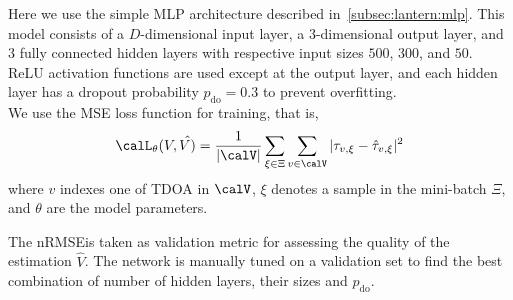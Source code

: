 \mynewline
Here we use the simple \ac{MLP} architecture described in~\cref{subsec:lantern:mlp}.
This model consists of a $D$-dimensional input layer, a 3-dimensional output layer, and 3 fully connected hidden layers with respective input sizes $500$, $300$, and $50$.
\ac{ReLU} activation functions are used except at the output layer, and each hidden layer has a dropout probability $p_\text{do} = 0.3$ to prevent overfitting.
\\We use the \ac{MSE} loss function for training, that is,
\begin{equation}\label{eq:lantern:mlploss}
    \calL_\theta(V, \hat{V)} = \frac{1}{|\calV|} \sum_{\xi\in\Xi} \sum_{v\in\calV} \powerOf{\tau_{v, \xi} - \hat{\tau}_{v, \xi}}
\end{equation}
where $v$ indexes one of \ac{TDOA} in $\calV$, $\xi$ denotes a sample in the mini-batch $\Xi$, and $\theta$ are the model parameters.

\mynewline
The \acf{nRMSE}is taken as validation metric for assessing the quality of the estimation $\hat{V}$.
The network is manually tuned on a validation set to find the best combination of number of hidden layers, their sizes and $p_\text{do}$.

